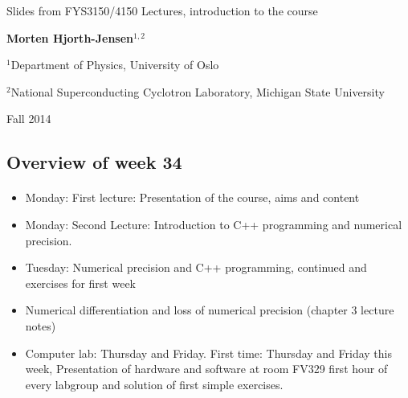 \documentclass[%
oneside,                 %
final,                   %
10pt]{article}
\begin{document}






\thispagestyle{empty}

\begin{center}
{\LARGE\bf
\begin{spacing}{1.25}
Slides from FYS3150/4150 Lectures, introduction to the course
\end{spacing}
}
\end{center}


\begin{center}
{\bf Morten Hjorth-Jensen${}^{1, 2}$} \\ [0mm]
\end{center}

\begin{center}
\centerline{{\small ${}^1$Department of Physics, University of Oslo}}
\centerline{{\small ${}^2$National Superconducting Cyclotron Laboratory, Michigan State University}}
\end{center}
    

\begin{center}
Fall 2014
\end{center}

\vspace{1cm}


\subsection*{Overview of week 34}


\paragraph{}
\begin{itemize}
  \item Monday: First lecture: Presentation of the course, aims and content

  \item Monday: Second Lecture: Introduction to C++ programming and numerical precision.

  \item Tuesday: Numerical precision and C++ programming, continued and exercises for first week

  \item Numerical differentiation and loss of numerical precision (chapter 3 lecture notes)

  \item Computer lab: Thursday and Friday. First time: Thursday and Friday this week, Presentation of hardware and software at room FV329 first hour of every labgroup and solution of first simple exercises.
\end{itemize}
\end{document}
